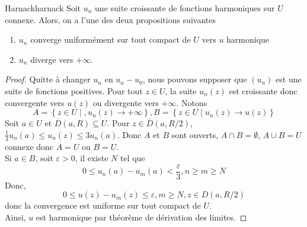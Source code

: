 \documentclass{cours}
\begin{document}
\begin{théorème}
	{Harnack}{harnack}
	Soit $u_{n}$ une suite croissante de fonctions harmoniques sur $U$ connexe. Alors, on a l'une des deux propositions suivantes
	\begin{enumerate}
		\item $u_{n}$ converge uniformément sur tout compact de $U$ vers $u$ harmonique
		\item $u_{n}$ diverge vers $+ \infty$. 
	\end{enumerate}
\end{théorème}
\begin{proof}
	Quitte à changer $u_{n}$ en $u_{n} - u_{0}$, nous pouvons supposer que $\left(u_{n}\right)$ est une suite de fonctions positives. Pour tout $z \in U$, la suite $u_{n}\left(z\right)$ est croissante donc convergente vers $u\left(z\right)$ ou divergente vers $+ \infty$. 
	Notons
	\begin{equation*}
		A = \left\{z \in U \middle|, u_{n}\left(z\right) \to + \infty\right\}, B = \left\{z \in U\middle| u_{n}\left(z\right) \to u\left(z\right)\right\}
	\end{equation*}
	Soit $a \in U$ et $\overline{D}\left(a, R\right) \subseteq U$. Pour $z \in \overline{D}\left(a, R/2\right)$, $\frac{1}{3}u_{n}\left(a\right) \leq u_{n}\left(z\right) \leq 3u_{n}\left(a\right)$. 
	Donc $A$ et $B$ sont ouverts, $A \cap B = \emptyset$, $A \cup B = U$ connexe donc $A = U$ ou $B = U$.\\
	Si $a \in B$, soit $\varepsilon > 0$, il existe $N$ tel que 
	\begin{equation*}
		0 \leq u_{n}\left(a\right) - u_{m}\left(a\right) < \frac{\varepsilon}{3}, n \geq m \geq N
	\end{equation*}
	Donc, 
	\begin{equation*}
		0 \leq u\left(z\right) - u_{m}\left(z\right) \leq \varepsilon, m \geq N, z \in D\left(a, R/2\right)
	\end{equation*}
	donc la convergence est uniforme sur tout compact de $U$. \\
	Ainsi, $u$ est harmonique par théorème de dérivation des limites. 
\end{proof}
\end{document}
